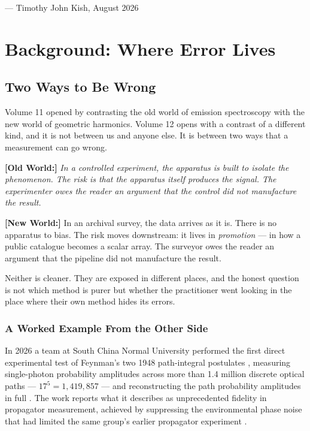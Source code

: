 \documentclass[11pt, letterpaper, openany]{book}
\newcommand{\oldworld}[1]{\noindent\textbf{\color{goldseal}[Old World:]} \textit{#1}\medskip}
\newcommand{\newworld}[1]{\noindent\textbf{\color{kishblue}[New World:]} #1\medskip}
\begin{document}
\vspace{1em}
\noindent\hfill --- Timothy John Kish, August 2026

\chapter{Background: Where Error Lives}

\section{Two Ways to Be Wrong}

Volume 11 opened by contrasting the old world of emission spectroscopy with the new world of
geometric harmonics. Volume 12 opens with a contrast of a different kind, and it is not
between us and anyone else. It is between two ways that a measurement can go wrong.

\oldworld{In a controlled experiment, the apparatus is built to isolate the phenomenon. The
risk is that the apparatus itself produces the signal. The experimenter owes the reader an
argument that the control did not manufacture the result.}

\newworld{In an archival survey, the data arrives as it is. There is no apparatus to bias.
The risk moves downstream: it lives in \emph{promotion} --- in how a public catalogue becomes
a scalar array. The surveyor owes the reader an argument that the pipeline did not manufacture
the result.}

Neither is cleaner. They are exposed in different places, and the honest question is not which
method is purer but whether the practitioner went looking in the place where their own method
hides its errors.

\subsection{A Worked Example From the Other Side}

In 2026 a team at South China Normal University performed the first direct experimental test
of Feynman's two 1948 path-integral postulates \cite{feynman1948}, measuring single-photon
probability amplitudes across more than 1.4 million discrete optical paths --- $17^5 =
1{,}419{,}857$ --- and reconstructing the path probability amplitudes in full
\cite{wen2026, wen2026data}. The work reports what it describes as unprecedented fidelity in
propagator measurement, achieved by suppressing the environmental phase noise that had limited
the same group's earlier propagator experiment \cite{scnu2023}.
\end{document}
